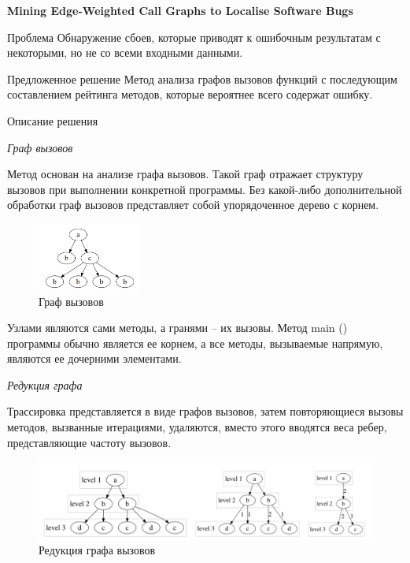 \def\notedate{2021.11.10}
\def\currentauthor{Крехтунова Д.Д. (РК6-73Б)}

\textbf{Mining Edge-Weighted Call Graphs to Localise Software Bugs}
\newline

Проблема
\newline
Обнаружение сбоев, которые приводят к ошибочным результатам с некоторыми, но не со всеми входными данными.
\newline

Предложенное решение
\newline
Метод анализа графов вызовов функций с последующим составлением рейтинга методов, которые вероятнее всего содержат ошибку. 
\newline

Описание решения

\textit{Граф вызовов}

Метод основан на анализе графа вызовов. Такой граф отражает структуру вызовов при выполнении конкретной программы. Без какой-либо дополнительной обработки граф вызовов представляет собой упорядоченное дерево с корнем.

\begin{figure}[h]
	\centering
	\includegraphics[width=0.3\textwidth]{ResearchNotes/images/krekhtunova/graph.png}
	\caption{Граф вызовов} 
\end{figure}

Узлами являются сами методы, а гранями – их вызовы. Метод main () программы обычно является ее корнем, а все методы, вызываемые напрямую, являются ее дочерними элементами.
\newline

\textit{Редукция графа}

Трассировка представляется в виде графов вызовов, затем повторяющиеся вызовы методов, вызванные итерациями, удаляются, вместо этого вводятся веса ребер, представляющие частоту вызовов. 

\begin{figure}[h]
	\centering
	\includegraphics[width=1\textwidth]{ResearchNotes/images/krekhtunova/reduction.png}
	\caption{Редукция графа вызовов} 
\end{figure}


